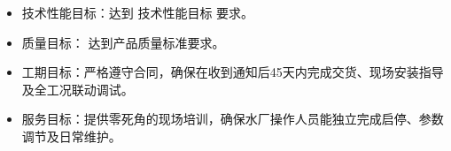 \begin{itemize}
    \item 技术性能目标：达到 技术性能目标 要求。
    \item 质量目标： 达到产品质量标准要求。
    \item 工期目标：严格遵守合同，确保在收到通知后45天内完成交货、现场安装指导及全工况联动调试。
    \item 服务目标：提供零死角的现场培训，确保水厂操作人员能独立完成启停、参数调节及日常维护。
\end{itemize}



